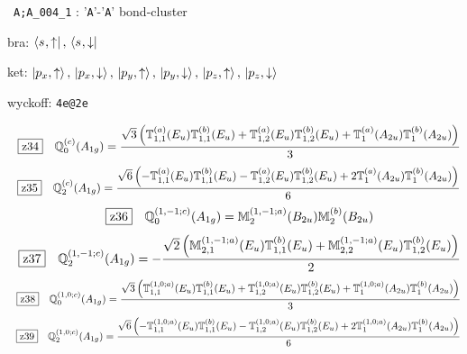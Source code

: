 \documentclass[fleqn,10pt,landscape]{jsarticle}
\begin{document}
\noindent\textbullet\, \texttt{A;A_004_1} : '\texttt{A}'-'\texttt{A}' bond-cluster

\noindent\quad * bra: $\bra{s_{},\uparrow},\, \bra{s_{},\downarrow}$

\noindent\quad * ket: $\ket{p_{x},\uparrow},\, \ket{p_{x},\downarrow},\, \ket{p_{y},\uparrow},\, \ket{p_{y},\downarrow},\, \ket{p_{z},\uparrow},\, \ket{p_{z},\downarrow}$

\noindent\quad * wyckoff: \texttt{4e@2e}

\begin{dmath*}
\hspace*{3mm}\fbox{z34}\quad \mathbb{Q}_{0}^{(c)}(A_{1g})=\frac{\sqrt{3} \left(\mathbb{T}_{1,1}^{(a)}(E_{u}) \mathbb{T}_{1,1}^{(b)}(E_{u}) + \mathbb{T}_{1,2}^{(a)}(E_{u}) \mathbb{T}_{1,2}^{(b)}(E_{u}) + \mathbb{T}_{1}^{(a)}(A_{2u}) \mathbb{T}_{1}^{(b)}(A_{2u})\right)}{3}
\end{dmath*}
\begin{dmath*}
\hspace*{3mm}\fbox{z35}\quad \mathbb{Q}_{2}^{(c)}(A_{1g})=\frac{\sqrt{6} \left(- \mathbb{T}_{1,1}^{(a)}(E_{u}) \mathbb{T}_{1,1}^{(b)}(E_{u}) - \mathbb{T}_{1,2}^{(a)}(E_{u}) \mathbb{T}_{1,2}^{(b)}(E_{u}) + 2 \mathbb{T}_{1}^{(a)}(A_{2u}) \mathbb{T}_{1}^{(b)}(A_{2u})\right)}{6}
\end{dmath*}
\begin{dmath*}
\hspace*{3mm}\fbox{z36}\quad \mathbb{Q}_{0}^{(1,-1;c)}(A_{1g})=\mathbb{M}_{2}^{(1,-1;a)}(B_{2u}) \mathbb{M}_{2}^{(b)}(B_{2u})
\end{dmath*}
\begin{dmath*}
\hspace*{3mm}\fbox{z37}\quad \mathbb{Q}_{2}^{(1,-1;c)}(A_{1g})=- \frac{\sqrt{2} \left(\mathbb{M}_{2,1}^{(1,-1;a)}(E_{u}) \mathbb{T}_{1,1}^{(b)}(E_{u}) + \mathbb{M}_{2,2}^{(1,-1;a)}(E_{u}) \mathbb{T}_{1,2}^{(b)}(E_{u})\right)}{2}
\end{dmath*}
\begin{dmath*}
\hspace*{3mm}\fbox{z38}\quad \mathbb{Q}_{0}^{(1,0;c)}(A_{1g})=\frac{\sqrt{3} \left(\mathbb{T}_{1,1}^{(1,0;a)}(E_{u}) \mathbb{T}_{1,1}^{(b)}(E_{u}) + \mathbb{T}_{1,2}^{(1,0;a)}(E_{u}) \mathbb{T}_{1,2}^{(b)}(E_{u}) + \mathbb{T}_{1}^{(1,0;a)}(A_{2u}) \mathbb{T}_{1}^{(b)}(A_{2u})\right)}{3}
\end{dmath*}
\begin{dmath*}
\hspace*{3mm}\fbox{z39}\quad \mathbb{Q}_{2}^{(1,0;c)}(A_{1g})=\frac{\sqrt{6} \left(- \mathbb{T}_{1,1}^{(1,0;a)}(E_{u}) \mathbb{T}_{1,1}^{(b)}(E_{u}) - \mathbb{T}_{1,2}^{(1,0;a)}(E_{u}) \mathbb{T}_{1,2}^{(b)}(E_{u}) + 2 \mathbb{T}_{1}^{(1,0;a)}(A_{2u}) \mathbb{T}_{1}^{(b)}(A_{2u})\right)}{6}
\end{dmath*}
\end{document}
